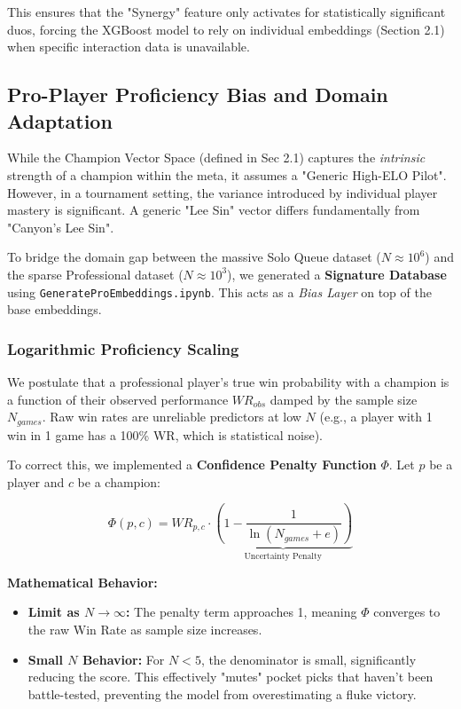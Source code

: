 \documentclass[12pt, a4paper]{article}
\begin{document}
    This ensures that the "Synergy" feature only activates for statistically significant duos, forcing the XGBoost model to rely on individual embeddings (Section 2.1) when specific interaction data is unavailable.

    \subsection{Pro-Player Proficiency Bias and Domain Adaptation}

    While the Champion Vector Space (defined in Sec 2.1) captures the \textit{intrinsic} strength of a champion within the meta, it assumes a "Generic High-ELO Pilot". However, in a tournament setting, the variance introduced by individual player mastery is significant. A generic "Lee Sin" vector differs fundamentally from "Canyon's Lee Sin".

    To bridge the domain gap between the massive Solo Queue dataset ($N \approx 10^6$) and the sparse Professional dataset ($N \approx 10^3$), we generated a \textbf{Signature Database} using \texttt{GenerateProEmbeddings.ipynb}. This acts as a \textit{Bias Layer} on top of the base embeddings.

    \subsubsection{Logarithmic Proficiency Scaling}
    We postulate that a professional player's true win probability with a champion is a function of their observed performance $WR_{obs}$ damped by the sample size $N_{games}$. Raw win rates are unreliable predictors at low $N$ (e.g., a player with 1 win in 1 game has a 100\% WR, which is statistical noise).

    To correct this, we implemented a \textbf{Confidence Penalty Function} $\Phi$. Let $p$ be a player and $c$ be a champion:

    \begin{equation}
        \Phi(p, c) = WR_{p,c} \cdot \underbrace{\left( 1 - \frac{1}{\ln(N_{games} + e)} \right)}_{\text{Uncertainty Penalty}}
    \end{equation}

    \textbf{Mathematical Behavior:}
    \begin{itemize}
        \item \textbf{Limit as $N \to \infty$:} The penalty term approaches 1, meaning $\Phi$ converges to the raw Win Rate as sample size increases.
        \item \textbf{Small $N$ Behavior:} For $N < 5$, the denominator is small, significantly reducing the score. This effectively "mutes" pocket picks that haven't been battle-tested, preventing the model from overestimating a fluke victory.
    \end{itemize}
\end{document}
